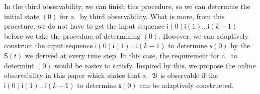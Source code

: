 In the third observability, we can finish this procedure, so we can determine the initial state \State$(0)$ for a \BCN\ by third observability. What is more, from this proceture, we do not have to get the input sequence $\mathsf{i}(0)\mathsf{i}(1)\ldots\mathsf{i}(k-1)$ before we take the procedure of determining \State$(0)$. However, we can adaptively construct the input sequence $\mathsf{i}(0)\mathsf{i}(1)\ldots\mathsf{i}(k-1)$ to determine $\mathsf{s}(0)$ by the $\mathsf{S}(t)$ we derived at every time step. In this case, the requirement for a \BCN\ to determint \State$(0)$ would be easier to satisfy. Inspired by this, we propose the online observability in this paper which states that a \BCN\ ${\mathcal{B}}$ is observable if the $\mathsf{i}(0)\mathsf{i}(1)\ldots\mathsf{i}(k-1)$ to determine $\mathsf{s}(0)$ can be adaptively constructed. %



